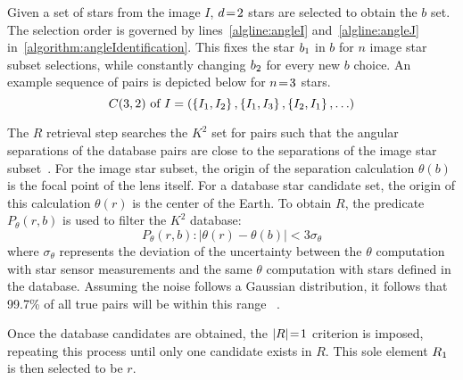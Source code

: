 Given a set of stars from the image $I$, $d \!=\! 2$ stars are selected to obtain the $b$ set.
The selection order is governed by lines~\ref{algline:angleI} and~\ref{algline:angleJ}
in~\autoref{algorithm:angleIdentification}.
This fixes the star $b_1$ in $b$ for $n$ image star subset selections, while constantly changing
$b_2$ for every new $b$ choice.
An example sequence of pairs is depicted below for $n \!=\! 3$ stars.
\begin{equation}
    C(3, 2) \text{ of } I = \left(\left\{ I_1, I_2 \right\}, \left\{ I_1,I_3 \right\}, \left\{ I_2,I_1 \right\},
    \ldots \right)
\end{equation}

The $R$ retrieval step searches the $K^2$ set for pairs such that the angular separations of the database pairs
are close to the separations of the image star subset~\cite{bratt:analysisStarIdentification}.
For the image star subset, the origin of the separation calculation $\theta(b)$ is the focal point of the lens
itself.
For a database star candidate set, the origin of this calculation $\theta(r)$ is the center of the Earth.
To obtain $R$, the predicate $P_\theta(r, b)$ is used to filter the $K^2$ database:
\begin{equation}\label{eq:angleRequirement}
    P_{\theta}(r, b) : \left\lvert \theta(r) - \theta(b)\right\rvert < 3 \sigma_\theta
\end{equation}
where $\sigma_{\theta}$ represents the deviation of the uncertainty between the $\theta$ computation with star
sensor measurements and the same $\theta$ computation with stars defined in the database.
Assuming the noise follows a Gaussian distribution, it follows that 99.7\% of all true pairs will be within this range
~\cite{coleAndCrassidis:sphericalTriangleMethod}.

Once the database candidates are obtained, the $\left| R \right| \!=\! 1$ criterion is imposed, repeating this process until only
one candidate exists in $R$.
This sole element $R_1$ is then selected to be $r$.

